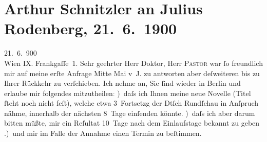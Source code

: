 

         
         \renewcommand{\erwaehntePersonen}{Personen: Willy Pastor, Julius Rodenberg}
         \renewcommand{\erwaehnteInstitutionen}{Institutionen: Deutsche Rundschau}
         \renewcommand{\erwaehnteOrte}{Orte: Berlin, Frankgasse, Wien}
         \renewcommand{\erwaehnteWerke}{Werke: Frau Bertha Garlan. Roman}
               \section[Arthur Schnitzler an Julius Rodenberg, 21. 6. 1900]{ Arthur Schnitzler an Julius Rodenberg, 21. 6. 1900}\nopagebreak{}\rehead{ }\begin{ledgroupsized}[t]{13cm}\normalsize\beginnumbering \toendnotes[C]{\smallbreak\pagebreak[2]} 
\toendnotes[C]{\smallbreak}\pstart
           \raggedleft{}{\pb}21. 6. 900{\\}Wien IX. Frankgaſſe 1.\pend
           \pstart{}Sehr geehrter Herr Doktor,\pend\pstart
           Herr \textsc{Pastor} war ſo freundlich mir auf meine erſte Anfrage Mitte Mai v J. zu
               antworten aber deſweiteren bis zu Ihrer Rückkehr zu verſchieben. Ich nehme an, Sie
               ſind wieder in Berlin und erlaube mir folgendes
                  mitzutheilen\textcolor{gray}{:}\pend
           ) daſs ich Ihnen meine neue Novelle (Titel ſteht noch nicht {\pb}feſt),
               welche etwa 3 Fortsetzg der Dtſch Rundſchau in
               Anſpruch nähme, innerhalb der nächsten 8 Tage einſenden könnte.\pend
           ) daſs ich aber darum bitten müßte, mir ein Reſultat  10 Tage nach dem Einlaufstage bekannt zu geben\pend
           .) und mir im Falle der Annahme einen Termin zu {\pb}beſtimmen.\pend

\end{ledgroupsized}
